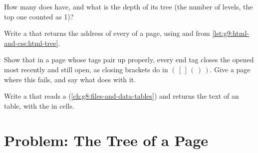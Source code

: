 \begin{exercise}[$\star\star$]\label{exo:g9:html-and-css:9}
How many  does  have, and what is the depth of its
tree (the number of levels, the top one counted as 1)?
\end{exercise}

\begin{exercise}[$\star\star\star$]\label{exo:g9:html-and-css:10}
Write a   that returns the address of every  of
a page, using  and  from
\cref{lst:g9:html-and-css:html-tree}.
\end{exercise}

\begin{exercise}[$\star\star\star$]\label{exo:g9:html-and-css:11}
Show that in a page whose tags pair up properly, every end tag closes the
 opened most recently and still open, as closing brackets do in
$(\,[\,]\,(\,)\,)$. Give a page where this fails, and say what
 does with it.
\end{exercise}

\begin{exercise}[$\star\star\star$]\label{exo:g9:html-and-css:12}
Write a   that reads a 
(\cref{ch:g8:files-and-data-tables}) and returns the text of an  table,
with the  in  cells.
\end{exercise}

\section{Problem: The Tree of a Page}

